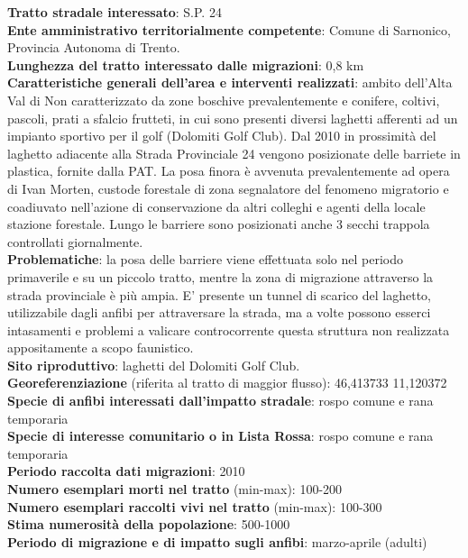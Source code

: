 \documentclass[11pt,a4paper,twoside]{memoir}
\begin{document}
\textbf{Tratto stradale interessato}: S.P. 24 \\
\textbf{Ente amministrativo territorialmente competente}: Comune di Sarnonico, Provincia Autonoma di Trento.  \\
\textbf{Lunghezza del tratto interessato dalle migrazioni}: 0,8 km \\
\textbf{Caratteristiche generali dell’area e interventi realizzati}: ambito dell'Alta Val di Non caratterizzato da zone boschive prevalentemente e conifere, coltivi, pascoli, prati a sfalcio frutteti, in cui sono presenti diversi laghetti afferenti ad un impianto sportivo per il golf (Dolomiti Golf Club). Dal 2010 in prossimità del laghetto adiacente alla Strada Provinciale 24 vengono posizionate delle barriete in plastica, fornite dalla PAT. La posa finora è avvenuta prevalentemente ad opera di Ivan Morten,  custode forestale di zona segnalatore del fenomeno migratorio e coadiuvato nell’azione di conservazione da altri colleghi e agenti della locale stazione forestale. Lungo le barriere sono posizionati anche 3 secchi trappola controllati giornalmente. \\
\textbf{Problematiche}: la posa delle barriere viene effettuata solo nel periodo primaverile e su un piccolo tratto, mentre la zona di migrazione attraverso la strada provinciale è più ampia. E' presente un tunnel di scarico del laghetto, utilizzabile dagli anfibi per attraversare la strada, ma a volte possono esserci intasamenti e problemi a valicare controcorrente questa struttura non realizzata appositamente a scopo faunistico. \\
\textbf{Sito riproduttivo}: laghetti del Dolomiti Golf Club.  \\
\textbf{Georeferenziazione} (riferita al tratto di maggior flusso): 46,413733 11,120372  \\
\textbf{Specie di anfibi interessati dall’impatto stradale}: rospo comune e rana temporaria \\
\textbf{Specie di interesse comunitario o in Lista Rossa}: rospo comune e rana temporaria \\
\textbf{Periodo raccolta dati migrazioni}: 2010 \\
\textbf{Numero esemplari morti nel tratto} (min-max): 100-200  \\
\textbf{Numero esemplari raccolti vivi nel tratto} (min-max): 100-300 \\
\textbf{Stima numerosità della popolazione}: 500-1000 \\
\textbf{Periodo di migrazione e di impatto sugli anfibi}: marzo-aprile (adulti) \\
\end{document}
